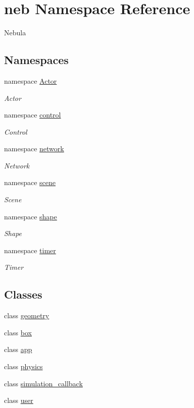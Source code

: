 \hypertarget{namespaceneb}{\section{neb \-Namespace \-Reference}
\label{namespaceneb}
}


\-Nebula  


\subsection*{\-Namespaces}
\begin{DoxyCompactItemize}
\item 
namespace \hyperlink{namespaceneb_1_1Actor}{\-Actor}
\begin{DoxyCompactList}\small\item\em \-Actor \end{DoxyCompactList}\item 
namespace \hyperlink{namespaceneb_1_1control}{control}
\begin{DoxyCompactList}\small\item\em \-Control \end{DoxyCompactList}\item 
namespace \hyperlink{namespaceneb_1_1network}{network}
\begin{DoxyCompactList}\small\item\em \-Network \end{DoxyCompactList}\item 
namespace \hyperlink{namespaceneb_1_1scene}{scene}
\begin{DoxyCompactList}\small\item\em \-Scene \end{DoxyCompactList}\item 
namespace \hyperlink{namespaceneb_1_1shape}{shape}
\begin{DoxyCompactList}\small\item\em \-Shape \end{DoxyCompactList}\item 
namespace \hyperlink{namespaceneb_1_1timer}{timer}
\begin{DoxyCompactList}\small\item\em \-Timer \end{DoxyCompactList}\end{DoxyCompactItemize}
\subsection*{\-Classes}
\begin{DoxyCompactItemize}
\item 
class \hyperlink{classneb_1_1geometry}{geometry}
\item 
class \hyperlink{classneb_1_1box}{box}
\item 
class \hyperlink{classneb_1_1app}{app}
\item 
class \hyperlink{classneb_1_1physics}{physics}
\item 
class \hyperlink{classneb_1_1simulation__callback}{simulation\-\_\-callback}
\item 
class \hyperlink{classneb_1_1user}{user}
\end{DoxyCompactItemize}
